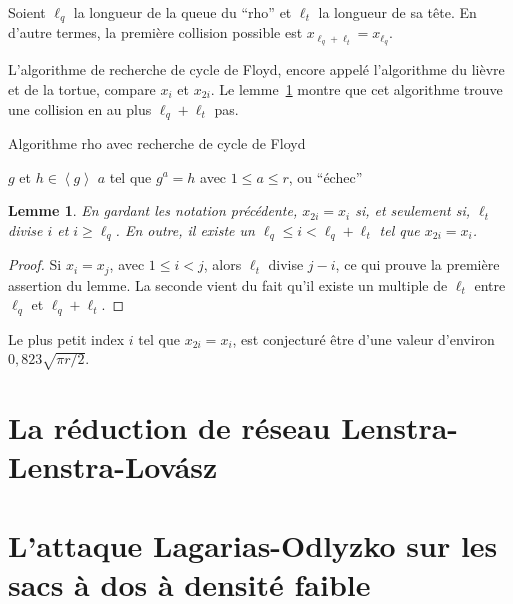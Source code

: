 \documentclass[a4paper, titlepage]{article}
\newtheorem{lemm}[theo]{Lemme}
\theoremstyle{definition}
\theoremstyle{remark}
\def\gen #1{\left\langle#1\right\rangle}
\begin{document}
Soient $\ell_q$ la longueur de la queue du ``rho'' et $\ell_t$ la longueur de sa tête. En d'autre termes, la première collision possible est $x_{\ell_q + \ell_t} = x_{\ell_q}$.

L'algorithme de recherche de cycle de Floyd, encore appelé l'algorithme du lièvre et de la tortue, compare $x_i$ et $x_{2i}$. Le lemme~\ref{lemmeFloyd} montre que cet algorithme trouve une collision en au plus $\ell_q  + \ell_t$ pas.

\begin{algorithm}[H]
\caption{Algorithme rho avec recherche de cycle de Floyd}
\label{algoRho}
\begin{algorithmic}[1]
\REQUIRE $g$ et $h \in \gen{g}$
\ENSURE $a$ tel que $g^a = h$ avec $1 \leqslant a \leqslant r$, ou ``échec''
	
\ENDWHILE
{}
\ELSE
\ENDIF
\end{algorithmic}
\end{algorithm}

\begin{lemm}\label{lemmeFloyd}
En gardant les notation précédente, $x_{2i} = x_i$ si, et seulement si, $\ell_t$ divise $i$ et $i \geqslant \ell_q$. En outre, il existe un $\ell_q \leqslant i < \ell_q + \ell_t$ tel que $x_{2i} = x_i$.
\end{lemm}

\begin{proof}
Si $x_i = x_j$, avec $1\leqslant i < j$, alors $\ell_t$ divise $j-i$, ce qui prouve la première assertion du lemme. La seconde vient du fait qu'il existe un multiple de $\ell_t$ entre $\ell_q$ et $\ell_q + \ell_t$.
\end{proof}

Le plus petit index $i$ tel que $x_{2i} = x_i$, est conjecturé être d'une valeur d'environ $0,823\sqrt{\pi r /2}$.

\section{La réduction de réseau Lenstra-Lenstra-Lov\'asz}

\section{L'attaque Lagarias-Odlyzko sur les sacs à dos à densité faible}
\end{document}
